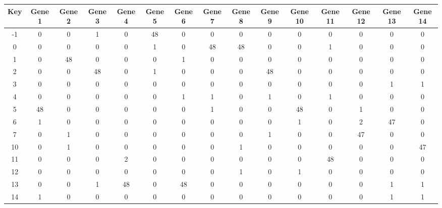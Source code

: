 \begin{tabular}{|c|c|c|c|c|c|c|c|c|c|c|c|c|c|c|}
\hline
Key & Gene 1 & Gene 2 & Gene 3 & Gene 4 & Gene 5 & Gene 6 & Gene 7 & Gene 8 & Gene 9 & Gene 10 & Gene 11 & Gene 12 & Gene 13 & Gene 14 \\
\hline
-1 & 0 & 0 & 1 & 0 & 48 & 0 & 0 & 0 & 0 & 0 & 0 & 0 & 0 & 0 \\
0 & 0 & 0 & 0 & 0 & 1 & 0 & 48 & 48 & 0 & 0 & 1 & 0 & 0 & 0 \\
1 & 0 & 48 & 0 & 0 & 0 & 1 & 0 & 0 & 0 & 0 & 0 & 0 & 0 & 0 \\
2 & 0 & 0 & 48 & 0 & 1 & 0 & 0 & 0 & 48 & 0 & 0 & 0 & 0 & 0 \\
3 & 0 & 0 & 0 & 0 & 0 & 0 & 0 & 0 & 0 & 0 & 0 & 0 & 1 & 1 \\
4 & 0 & 0 & 0 & 0 & 0 & 1 & 1 & 0 & 1 & 0 & 1 & 0 & 0 & 0 \\
5 & 48 & 0 & 0 & 0 & 0 & 0 & 1 & 0 & 0 & 48 & 0 & 1 & 0 & 0 \\
6 & 1 & 0 & 0 & 0 & 0 & 0 & 0 & 0 & 0 & 1 & 0 & 2 & 47 & 0 \\
7 & 0 & 1 & 0 & 0 & 0 & 0 & 0 & 0 & 1 & 0 & 0 & 47 & 0 & 0 \\
10 & 0 & 1 & 0 & 0 & 0 & 0 & 0 & 1 & 0 & 0 & 0 & 0 & 0 & 47 \\
11 & 0 & 0 & 0 & 2 & 0 & 0 & 0 & 0 & 0 & 0 & 48 & 0 & 0 & 0 \\
12 & 0 & 0 & 0 & 0 & 0 & 0 & 0 & 1 & 0 & 1 & 0 & 0 & 0 & 0 \\
13 & 0 & 0 & 1 & 48 & 0 & 48 & 0 & 0 & 0 & 0 & 0 & 0 & 1 & 1 \\
14 & 1 & 0 & 0 & 0 & 0 & 0 & 0 & 0 & 0 & 0 & 0 & 0 & 1 & 1 \\
\hline
\end{tabular}